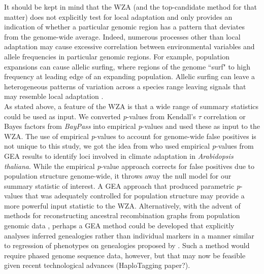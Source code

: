 \documentclass[10pt,twoside,lineno]{GSA_format}
\begin{document}
It should be kept in mind that the WZA (and the top-candidate method for that matter) does not explicitly test for local adaptation and only provides an indication of whether a particular genomic region has a pattern that deviates from the genome-wide average. Indeed, numerous processes other than local adaptation may cause excessive correlation between environmental variables and allele frequencies in particular genomic regions. For example, population expansions can cause allelic surfing, where regions of the genome ``surf" to high frequency at leading edge of an expanding population. Allelic surfing can leave a heterogeneous patterns of variation across a species range leaving signals that may resemble local adaptation \citep{Novembre2009, Klopfstein2006}.  \\

As stated above, a feature of the WZA is that a wide range of summary statistics could be used as input. We converted \textit{p}-values from Kendall's $\tau$ correlation or Bayes factors from \textit{BayPass} into empirical \textit{p}-values and used these as input to the WZA. The use of empirical \textit{p}-values to account for genome-wide false positives is not unique to this study, we got the idea from \cite{Hancock2011} who used empirical \textit{p}-values from GEA results to identify loci involved in climate adaptation in \textit{Arabidopsis thaliana}. While the empirical \textit{p}-value approach corrects for false positives due to population structure genome-wide, it throws away the null model for our summary statistic of interest. A GEA approach that produced parametric \textit{p}-values that was adequately controlled for population structure may provide a more powerful input statistic to the WZA. Alternatively, with the advent of methods for reconstructing ancestral recombination graphs from population genomic data \citep{Hejase2020}, perhaps a GEA method could be developed that explicitly analyses inferred genealogies rather than individual markers in a manner similar to regression of phenotypes on genealogies proposed by \cite{Ralph2020}. Such a method would require phased genome sequence data, however, but that may now be feasible given recent technological advances (HaploTagging paper?).  \\
\end{document}
